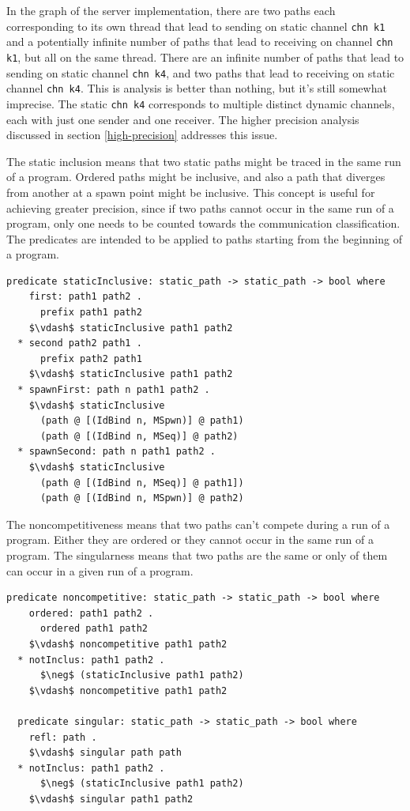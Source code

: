 \documentclass[letterpaper, 11pt]{extarticle}
\begin{document}
In the graph of the server implementation, there are two paths each corresponding to its
own thread that lead
to sending on
static channel \lstinline[language=sugar_lang]{chn k1} and a potentially infinite number of
paths that lead to receiving on
channel \lstinline[language=sugar_lang]{chn k1}, but all on the same thread.
There are an infinite number of paths that lead
to sending on static channel \lstinline[language=sugar_lang]{chn k4}, and two paths
that lead to receiving on static channel
\lstinline[language=sugar_lang]{chn k4}. This is analysis is better than nothing,
but it's still somewhat imprecise. The static \lstinline[language=sugar_lang]{chn k4} corresponds to
multiple distinct dynamic channels, each with just one sender and one receiver. The higher
precision analysis discussed in section \ref{high-precision} addresses this issue.

The static inclusion means that two static paths might be traced in
the same run of a program. Ordered paths might be inclusive, and also a path that diverges
from another at a spawn point might be inclusive. This concept is useful for achieving
greater precision, since if two paths cannot occur in the same run of a program, only one needs
to be counted towards the communication classification. The predicates are intended to be applied
to paths starting from the beginning of a program.

\begin{lstlisting}[language=logic, mathescape]
  predicate staticInclusive: static_path -> static_path -> bool where
    first: path1 path2 .
      prefix path1 path2
    $\vdash$ staticInclusive path1 path2
  * second path2 path1 .
      prefix path2 path1
    $\vdash$ staticInclusive path1 path2
  * spawnFirst: path n path1 path2 .
    $\vdash$ staticInclusive
      (path @ [(IdBind n, MSpwn)] @ path1)
      (path @ [(IdBind n, MSeq)] @ path2)
  * spawnSecond: path n path1 path2 .
    $\vdash$ staticInclusive
      (path @ [(IdBind n, MSeq)] @ path1])
      (path @ [(IdBind n, MSpwn)] @ path2)
\end{lstlisting}

The noncompetitiveness means that two paths can't compete during a run of a
program. Either they are ordered or they cannot occur in the same run of a program.
The singularness means that two paths are the same or only of them can occur
in a given run of a program. 

\begin{lstlisting}[language=logic, mathescape]
  predicate noncompetitive: static_path -> static_path -> bool where
    ordered: path1 path2 .
      ordered path1 path2
    $\vdash$ noncompetitive path1 path2
  * notInclus: path1 path2 .
      $\neg$ (staticInclusive path1 path2)
    $\vdash$ noncompetitive path1 path2

  predicate singular: static_path -> static_path -> bool where
    refl: path .
    $\vdash$ singular path path
  * notInclus: path1 path2 .
      $\neg$ (staticInclusive path1 path2)
    $\vdash$ singular path1 path2
\end{lstlisting}
\end{document}
